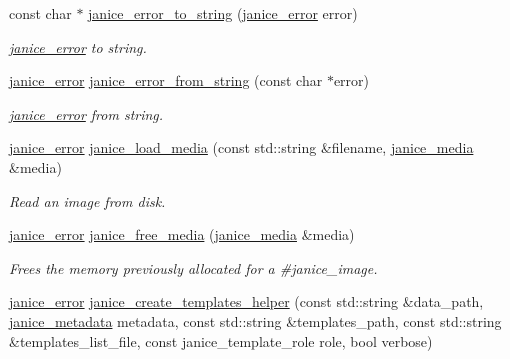 \begin{DoxyCompactItemize}
\item 
const char $\ast$ \hyperlink{group__janice__io_gaab03ac29fa90f0807739c6eecb82cf63}{janice\+\_\+error\+\_\+to\+\_\+string} (\hyperlink{group__janice_ga4873d49c1f9d6a6880dfbd485cf6ba72}{janice\+\_\+error} error)
\begin{DoxyCompactList}\small\item\em \hyperlink{group__janice_gac9071fe2c752efef60aa3f932a290fda}{janice\+\_\+error} to string. \end{DoxyCompactList}\item 
\hyperlink{group__janice_ga4873d49c1f9d6a6880dfbd485cf6ba72}{janice\+\_\+error} \hyperlink{group__janice__io_ga68c2c0091b2ca233b94197a50760c328}{janice\+\_\+error\+\_\+from\+\_\+string} (const char $\ast$error)
\begin{DoxyCompactList}\small\item\em \hyperlink{group__janice_gac9071fe2c752efef60aa3f932a290fda}{janice\+\_\+error} from string. \end{DoxyCompactList}\item 
\hyperlink{group__janice_ga4873d49c1f9d6a6880dfbd485cf6ba72}{janice\+\_\+error} \hyperlink{group__janice__io_ga8d4d3629b0cf5ec3c0c9fc038e027098}{janice\+\_\+load\+\_\+media} (const std\+::string \&filename, \hyperlink{structjanice__media}{janice\+\_\+media} \&media)
\begin{DoxyCompactList}\small\item\em Read an image from disk. \end{DoxyCompactList}\item 
\hyperlink{group__janice_ga4873d49c1f9d6a6880dfbd485cf6ba72}{janice\+\_\+error} \hyperlink{group__janice__io_gae6b63c3701cb2670910dafee6f66a6b6}{janice\+\_\+free\+\_\+media} (\hyperlink{structjanice__media}{janice\+\_\+media} \&media)
\begin{DoxyCompactList}\small\item\em Frees the memory previously allocated for a \#janice\+\_\+image. \end{DoxyCompactList}\item 
\hyperlink{group__janice_ga4873d49c1f9d6a6880dfbd485cf6ba72}{janice\+\_\+error} \hyperlink{group__janice__io_ga624424f697b87c40cadcb11ca69d2a6a}{janice\+\_\+create\+\_\+templates\+\_\+helper} (const std\+::string \&data\+\_\+path, \hyperlink{group__janice__io_ga98fb8d1945016f13408aa772de4c3e64}{janice\+\_\+metadata} metadata, const std\+::string \&templates\+\_\+path, const std\+::string \&templates\+\_\+list\+\_\+file, const janice\+\_\+template\+\_\+role role, bool verbose)

\end{DoxyCompactItemize}
